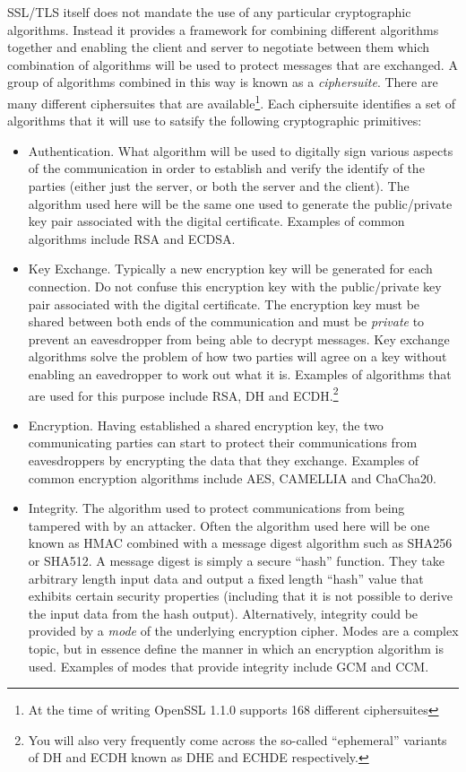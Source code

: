 SSL/TLS itself does not mandate the use of any particular cryptographic 
algorithms. Instead it provides a framework for combining different algorithms 
together and enabling the client and server to negotiate between them which 
combination of algorithms will be used to protect messages that are exchanged. 
A group of algorithms combined in this way is known as a \emph{ciphersuite}. 
There are many different ciphersuites that are available\footnote{At the time 
of writing OpenSSL 1.1.0 supports 168 different ciphersuites}. Each
ciphersuite identifies a set of algorithms that it will use to satsify the 
following cryptographic primitives:
\begin{itemize}
\item Authentication. What algorithm will be used to digitally sign various 
aspects of the communication in order to establish and verify the identify of
the parties (either just the server, or both the server and the client). The 
algorithm used here will be the same one used to generate the public/private 
key pair associated with the digital certificate. Examples of common algorithms 
include RSA and ECDSA.
\item Key Exchange. Typically a new encryption key will be generated for each
connection. Do not confuse this encryption key with the public/private key pair
associated with the digital certificate. The encryption key must be shared
between both ends of the communication and must be \emph{private} to prevent an
eavesdropper from being able to decrypt messages. Key exchange algorithms solve 
the problem of how two parties will agree on a key without enabling an 
eavedropper to work out what it is. Examples of algorithms that are used for 
this purpose include RSA, DH and ECDH.\footnote{You will also very
frequently come across the so-called ``ephemeral'' variants of DH and ECDH
known as DHE and ECHDE respectively.}
\item Encryption. Having established a shared encryption key, the two 
communicating parties can start to protect their communications from 
eavesdroppers by encrypting the data that they exchange. Examples of common 
encryption algorithms include AES, CAMELLIA and ChaCha20.
\item Integrity. The algorithm used to protect communications from being 
tampered with by an attacker. Often the algorithm used here will be one known 
as HMAC combined with a message digest algorithm such as SHA256 or SHA512. A
message digest is simply a secure ``hash'' function. They take arbitrary 
length input data and output a fixed length ``hash'' value that exhibits 
certain security properties (including that it is not possible to derive the 
input data from the hash output). Alternatively, integrity could be provided by
a \emph{mode} of the underlying  encryption cipher. Modes are a complex topic,
but in essence define the manner in which an encryption algorithm is used.
Examples of modes that provide integrity include GCM and CCM.
\end{itemize}

